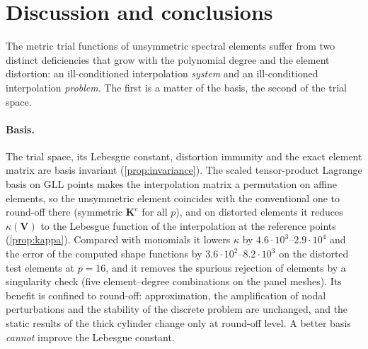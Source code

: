 \section{Discussion and conclusions}\label{sec:conclusions}
The metric trial functions of unsymmetric spectral elements suffer from two distinct
deficiencies that grow with the polynomial degree and the element distortion: an
ill-conditioned interpolation \emph{system} and an ill-conditioned interpolation
\emph{problem}. The first is a matter of the basis, the second of the trial space.

\paragraph{Basis.} The trial space, its Lebesgue constant, distortion immunity and the exact
element matrix are basis invariant (\cref{prop:invariance}). The scaled tensor-product Lagrange
basis on GLL points makes the interpolation matrix a permutation on affine elements, so the
unsymmetric element coincides with the conventional one to round-off there (symmetric
$\bm K^e$ for all $p$), and on distorted elements it reduces $\kappa(\bm V)$ to the Lebesgue
function of the interpolation at the reference points (\cref{prop:kappa}). Compared with
monomials it lowers $\kappa$ by $4.6\cdot10^3$--$2.9\cdot10^4$ and the error of the computed shape
functions by $3.6\cdot10^2$--$8.2\cdot10^3$ on the distorted test elements at $p=16$, and it removes the
spurious rejection of elements by a singularity check (five element--degree combinations on the panel meshes). Its
benefit is confined to round-off: approximation, the amplification of nodal perturbations and
the stability of the discrete problem are unchanged, and the static results of the thick cylinder
change only at round-off level. A better basis \emph{cannot} improve the Lebesgue constant.

